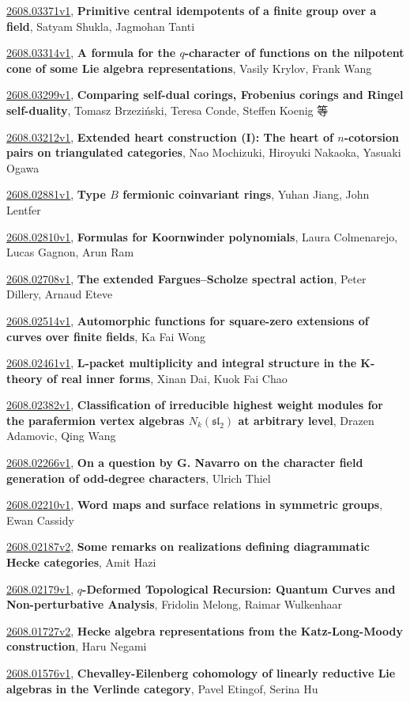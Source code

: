 \documentclass[9pt, a4paper]{article}
\theoremstyle{plain}
\theoremstyle{definition}
\theoremstyle{remark}
\newcommand{\arxiv}[3]{\href{https://arxiv.org/abs/#1}{#1}, \textbf{\textcolor{arxivblue}{#2}}, #3}
\begin{document}
\arxiv{2608.03371v1}{Primitive central idempotents of a finite group over a field}{Satyam Shukla, Jagmohan Tanti}

\arxiv{2608.03314v1}{A formula for the $q$-character of functions on the nilpotent cone of some Lie algebra representations}{Vasily Krylov, Frank Wang}

\arxiv{2608.03299v1}{Comparing self-dual corings, Frobenius corings and Ringel self-duality}{Tomasz Brzeziński, Teresa Conde, Steffen Koenig 等}

\arxiv{2608.03212v1}{Extended heart construction (I): The heart of $n$-cotorsion pairs on triangulated categories}{Nao Mochizuki, Hiroyuki Nakaoka, Yasuaki Ogawa}

\arxiv{2608.02881v1}{Type $B$ fermionic coinvariant rings}{Yuhan Jiang, John Lentfer}

\arxiv{2608.02810v1}{Formulas for Koornwinder polynomials}{Laura Colmenarejo, Lucas Gagnon, Arun Ram}

\arxiv{2608.02708v1}{The extended Fargues--Scholze spectral action}{Peter Dillery, Arnaud Eteve}

\arxiv{2608.02514v1}{Automorphic functions for square-zero extensions of curves over finite fields}{Ka Fai Wong}

\arxiv{2608.02461v1}{L-packet multiplicity and integral structure in the K-theory of real inner forms}{Xinan Dai, Kuok Fai Chao}

\arxiv{2608.02382v1}{Classification of irreducible highest weight modules for the parafermion vertex algebras $N_k(\mathfrak{sl}_2)$ at arbitrary level}{Drazen Adamovic, Qing Wang}

\arxiv{2608.02266v1}{On a question by G. Navarro on the character field generation of odd-degree characters}{Ulrich Thiel}

\arxiv{2608.02210v1}{Word maps and surface relations in symmetric groups}{Ewan Cassidy}

\arxiv{2608.02187v2}{Some remarks on realizations defining diagrammatic Hecke categories}{Amit Hazi}

\arxiv{2608.02179v1}{$q$-Deformed Topological Recursion: Quantum Curves and Non-perturbative Analysis}{Fridolin Melong, Raimar Wulkenhaar}

\arxiv{2608.01727v2}{Hecke algebra representations from the Katz-Long-Moody construction}{Haru Negami}

\arxiv{2608.01576v1}{Chevalley-Eilenberg cohomology of linearly reductive Lie algebras in the Verlinde category}{Pavel Etingof, Serina Hu}
\end{document}
